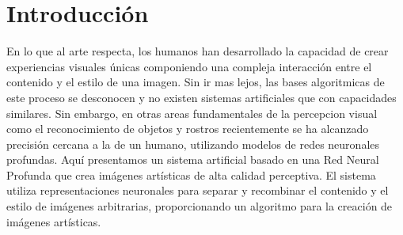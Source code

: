 \documentclass[a4paper,11pt,spanish]{book}
\begin{document}
    \section{Introducción}
      En lo que al arte respecta, los humanos han desarrollado la capacidad de crear experiencias visuales únicas componiendo una compleja interacción entre el contenido y el estilo de una imagen.
      Sin ir mas lejos, las bases algoritmicas de este proceso se desconocen y no existen sistemas artificiales que con capacidades similares. Sin embargo, en otras areas fundamentales
      de la percepcion visual como el reconocimiento de objetos y rostros recientemente se ha alcanzado precisión cercana a la de un humano, utilizando modelos de redes neuronales profundas.
      Aquí presentamos un sistema artificial basado en una Red Neural Profunda que crea imágenes artísticas de alta calidad perceptiva. El sistema utiliza representaciones neuronales
      para separar y recombinar el contenido y el estilo de imágenes arbitrarias, proporcionando un algoritmo para la creación de imágenes artísticas.
\end{document}
